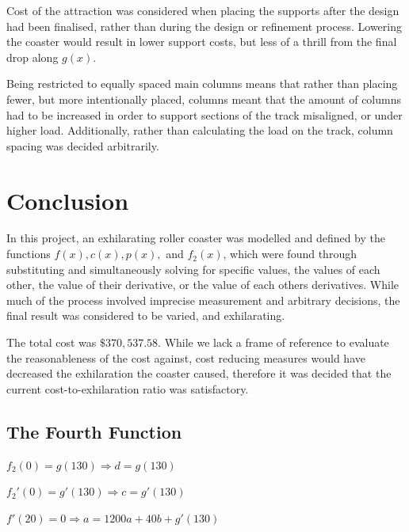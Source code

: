 \documentclass[10pt, letterpaper]{article}
\begin{document}
Cost of the attraction was considered when placing the supports after the design had been finalised, rather than during the design or refinement process. Lowering the coaster would result in lower support costs, but less of a thrill from the final drop along $g(x)$. 

Being restricted to equally spaced main columns means that rather than placing fewer, but more intentionally placed, columns meant that the amount of columns had to be increased in order to support sections of the track misaligned, or under higher load. Additionally, rather than calculating the load on the track, column spacing was decided arbitrarily.
\section{Conclusion}
In this project, an exhilarating roller coaster was modelled and defined by the functions $f(x), c(x), p(x),$ and $f_2(x)$, which were found through substituting and simultaneously solving for specific values, the values of each other, the value of their derivative, or the value of each others derivatives. While much of the process involved imprecise measurement and arbitrary decisions, the final result was considered to be varied, and exhilarating. 

The total cost was $\$370,537.58$. While we lack a frame of reference to evaluate the reasonableness of the cost against, cost reducing measures would have decreased the exhilaration the coaster caused, therefore it was decided that the current cost-to-exhilaration ratio was satisfactory.



\begin{appendices}

	\section{The Fourth Function}
	$f_2(0)=g(130)\Rightarrow d=g(130)$
	
	$f_2'(0) = g'(130)\Rightarrow c=g'(130)$
	
	$f'(20)=0\Rightarrow a=1200a+40b+g'(130)$
	
	
\end{appendices}
\end{document}
